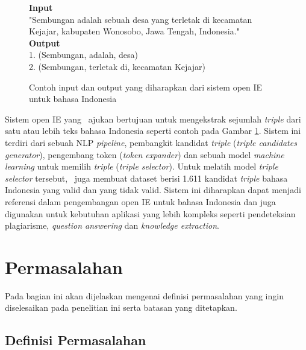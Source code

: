 \begin{figure}
	\begin{mdframed}
		\textbf{Input} \\
		"Sembungan adalah sebuah desa yang terletak di kecamatan Kejajar, kabupaten Wonosobo, Jawa Tengah, Indonesia." \\
		
		\textbf{Output} \\
		1. (Sembungan, adalah, desa) \\
		2. (Sembungan, terletak di, kecamatan Kejajar)
	\end{mdframed}
	\caption{Contoh input dan output yang diharapkan dari sistem open IE untuk bahasa Indonesia}
	\label{fig:example_io_openie}
\end{figure}

Sistem open IE yang \saya~ajukan bertujuan untuk mengekstrak sejumlah \textit{triple} dari satu atau lebih teks bahasa Indonesia seperti contoh pada Gambar \ref{fig:example_io_openie}. Sistem ini terdiri dari sebuah NLP \textit{pipeline}, pembangkit kandidat \textit{triple} (\textit{triple candidates generator}), pengembang token (\textit{token expander}) dan sebuah model \textit{machine learning} untuk memilih \textit{triple} (\textit{triple selector}). Untuk melatih model \textit{triple selector} tersebut, \saya~juga membuat dataset berisi 1.611 kandidat \textit{triple} bahasa Indonesia yang valid dan yang tidak valid. Sistem ini diharapkan dapat menjadi referensi dalam pengembangan open IE untuk bahasa Indonesia dan juga digunakan untuk kebutuhan aplikasi yang lebih kompleks seperti pendeteksian plagiarisme, \textit{question answering} dan \textit{knowledge extraction}.

\section{Permasalahan}
Pada bagian ini akan dijelaskan mengenai definisi permasalahan yang ingin diselesaikan pada penelitian ini serta batasan yang ditetapkan.


\subsection{Definisi Permasalahan}

